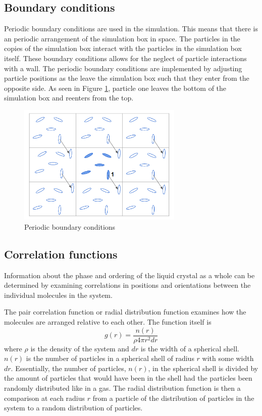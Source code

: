 \documentclass[preprint, aps]{revtex4-1}
\begin{document}
\subsection*{Boundary conditions}
Periodic boundary conditions are used in the simulation. This means that there 
is an periodic arrangement of the simulation box in space. The particles in the
copies of the simulation box interact with the particles in the simulation box
itself. These boundary conditions allows for the neglect of particle
interactions with a wall. The periodic boundary conditions are implemented by
adjusting particle positions as the	leave the simulation box such that they
enter from the opposite side. As seen in Figure \ref{fig:periodic}, particle 
one leaves the bottom of the simulation box and reenters from the top.
	\begin{figure}[H]
		\centering
		\includegraphics[width=0.7\textwidth]{periodic.png}
		\caption{Periodic boundary conditions}
		\label{fig:periodic}
	\end{figure}

\subsection*{Correlation functions}
Information about the phase and ordering of the liquid crystal as a whole can be
determined by examining correlations in positions and orientations between the
individual molecules in the system.

The pair correlation function or radial distribution function examines how the
molecules are arranged relative to each other. The function itself is
	\begin{equation}
	        g(r)=\frac{n(r)}{\rho 4 \pi r^2 dr}
	\end{equation}
where $\rho$ is the density of the system and $dr$ is the width of a spherical
shell. $n(r)$ is the number of particles in a spherical shell of radius $r$ with
some width $dr$. Essentially, the number of particles, $n(r)$, in the spherical
shell is divided by the amount of particles that would have been in the shell
had the particles been randomly distributed like in a gas. The radial
distribution function is then a comparison at each radius $r$ from a particle 
of the distribution of particles in the system to a random distribution of 
particles. 
\end{document}
